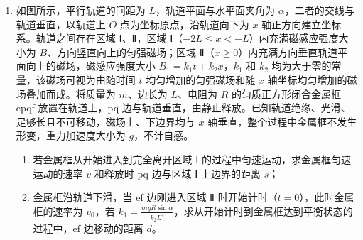 \documentclass[\gkver]{gaokaozhenti}
\begin{document}
\begin{enumerate}
{联立解得 $v_{1} = 6 \Ums$、$v_{2} = \frac{2}{3} \Ums$

即小球速度为 $6 \Ums$，方向水平向左，方形物体速度为 $\frac{2}{3} \Ums$，方向水平向右。

（2）由于小球落在物块 a 正上方，并与其粘连，小球竖直方向速度变为 0，小球和物块 a 水平方向上动量守恒，则有 $mv_{1} = (m + m_{a})v_{3}$

解得 $v_{3} = 2 \Ums$

设当弹簧形变量为 $x_{1}$ 时物块 b 的固定解除，此时小球和物块 a 的速度为 $v_{4}$，根据胡克定律 $F = kx_{1}$

系统机械能守恒 $\frac{1}{2}(m + m_{a})v_{3}^{2} = \frac{1}{2}(m + m_{a})v_{4}^{2} + \frac{1}{2}kx_{1}^{2}$

联立解得 $v_{4} = 1 \Ums$，$x_{1} = 0.3 \Um$

固定解除之后，小球、物块 a 和物块 b 组成的系统动量守恒，当三者共速时，弹簧的弹性势能最大，由动量守恒定律有 $(m + m_{a})v_{4} = (m + m_{a} + m_{b})v_{b}$

解得 $v_{b} = \frac{2}{3} \Ums$，方向水平向左。

由能量守恒定律可得，最大弹性势能为

$E_{pm} = \frac{1}{2}(m + m_{a})v_{4}^{2} + \frac{1}{2}kx_{1}^{2} - \frac{1}{2}(m + m_{a} + m_{b})v_{b}^{2} = 2.5 \UJ$
}

\item
如图所示，平行轨道的间距为 $L$，轨道平面与水平面夹角为 $\alpha$，二者的交线与轨道垂直，以轨道上 $O$ 点为坐标原点，沿轨道向下为 $x$ 轴正方向建立坐标系。轨道之间存在区域 Ⅰ、Ⅱ，区域 Ⅰ（$-2L \leq x < -L$）内充满磁感应强度大小为 $B$、方向竖直向上的匀强磁场；区域 Ⅱ（$x \geq 0$）内充满方向垂直轨道平面向上的磁场，磁感应强度大小 $B_{1} = k_{1}t + k_{2}x$，$k_{1}$ 和 $k_{2}$ 均为大于零的常量，该磁场可视为由随时间 $t$ 均匀增加的匀强磁场和随 $x$ 轴坐标均匀增加的磁场叠加而成。将质量为 $m$、边长为 $L$、电阻为 $R$ 的匀质正方形闭合金属框 epqf 放置在轨道上，pq 边与轨道垂直，由静止释放。已知轨道绝缘、光滑、足够长且不可移动，磁场上、下边界均与 $x$ 轴垂直，整个过程中金属框不发生形变，重力加速度大小为 $g$，不计自感。
\begin{enumerate}
	\item
	若金属框从开始进入到完全离开区域 Ⅰ 的过程中匀速运动，求金属框匀速运动的速率 $v$ 和释放时 pq 边与区域 Ⅰ 上边界的距离 $s$；
	\item
	金属框沿轨道下滑，当 ef 边刚进入区域 Ⅱ 时开始计时（$t = 0$），此时金属框的速率为 $v_{0}$，若 $k_{1} = \frac{mgR\sin\alpha}{k_{2}L^{4}}$，求从开始计时到金属框达到平衡状态的过程中，ef 边移动的距离 $d$。
\end{enumerate}


\end{enumerate}
\end{document}
